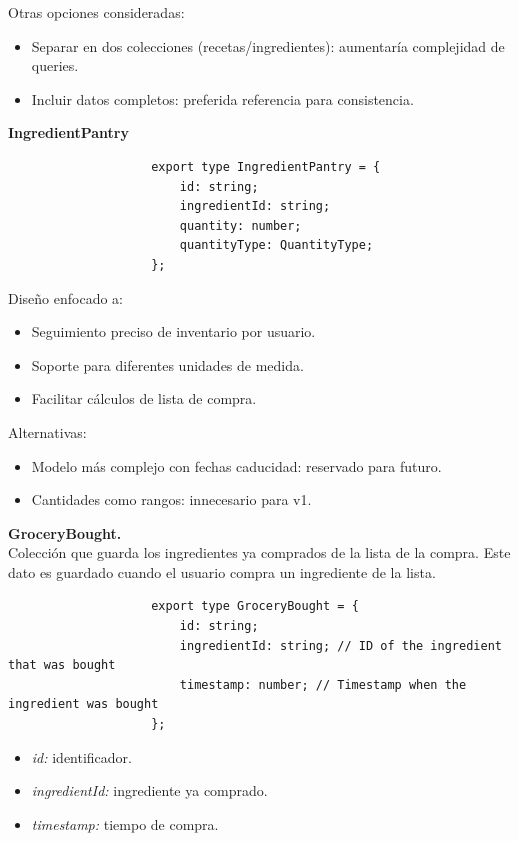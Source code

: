 \documentclass[twoside, openright, 11pt]{report}
\begin{document}
				Otras opciones consideradas:
				\begin{itemize}
					\item Separar en dos colecciones (recetas/ingredientes): aumentaría complejidad de queries.
					\item Incluir datos completos: preferida referencia para consistencia.
				\end{itemize}
			
				
				\textbf{IngredientPantry}
				\begin{lstlisting}
					export type IngredientPantry = {
						id: string;
						ingredientId: string;
						quantity: number;
						quantityType: QuantityType;
					};
				\end{lstlisting}
				
				Diseño enfocado a:
				\begin{itemize}
					\item Seguimiento preciso de inventario por usuario.
					\item Soporte para diferentes unidades de medida.
					\item Facilitar cálculos de lista de compra.
				\end{itemize}
				
				Alternativas:
				\begin{itemize}
					\item Modelo más complejo con fechas caducidad: reservado para futuro.
					\item Cantidades como rangos: innecesario para v1.
				\end{itemize}
			
			
				\textbf{GroceryBought.}\\ Colección que guarda los ingredientes ya comprados de la lista de la compra. Este dato es guardado cuando el usuario compra un ingrediente de la lista.
				\begin{lstlisting}
					export type GroceryBought = {
						id: string;
						ingredientId: string; // ID of the ingredient that was bought
						timestamp: number; // Timestamp when the ingredient was bought
					};
				\end{lstlisting}
				\begin{itemize}
					\item \textit{id:} identificador.
					\item \textit{ingredientId:} ingrediente ya comprado.
					\item \textit{timestamp:} tiempo de compra.
				\end{itemize}
				
\end{document}
